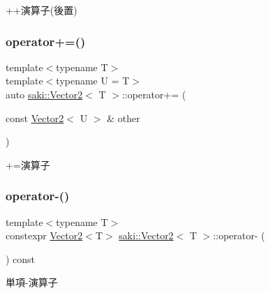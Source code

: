 ++演算子(後置) 

\mbox{\label{classsaki_1_1_vector2_aa76ccb2d2228441d510dca7781f785d3}} 
\subsubsection{\texorpdfstring{operator+=()}{operator+=()}}
{\footnotesize\ttfamily template$<$typename T$>$ \\
template$<$typename U  = T$>$ \\
auto \mbox{\hyperlink{classsaki_1_1_vector2}{saki\+::\+Vector2}}$<$ T $>$\+::operator+= (\begin{DoxyParamCaption}\item[{const \mbox{\hyperlink{classsaki_1_1_vector2}{Vector2}}$<$ U $>$ \&}]{other }\end{DoxyParamCaption})\hspace{0.3cm}{\ttfamily [inline]}}



+=演算子 

\mbox{\label{classsaki_1_1_vector2_a05806f91f658e3c11cd364a6d299e363}} 
\subsubsection{\texorpdfstring{operator-\/()}{operator-()}}
{\footnotesize\ttfamily template$<$typename T$>$ \\
constexpr \mbox{\hyperlink{classsaki_1_1_vector2}{Vector2}}$<$T$>$ \mbox{\hyperlink{classsaki_1_1_vector2}{saki\+::\+Vector2}}$<$ T $>$\+::operator-\/ (\begin{DoxyParamCaption}{ }\end{DoxyParamCaption}) const\hspace{0.3cm}{\ttfamily [inline]}}



単項-\/演算子 

\mbox{\label{classsaki_1_1_vector2_a18a60739e3bf2673b1b2c28b523b6383}} 
